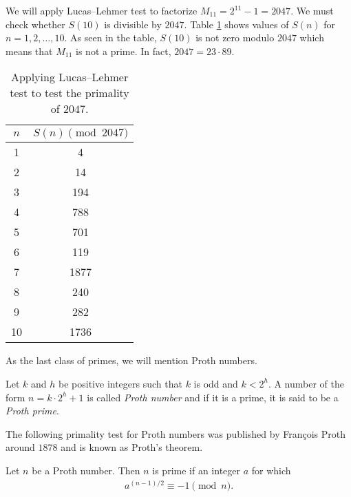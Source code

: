 \documentclass{subfiles}
\begin{document}
	\begin{example}
		We will apply Lucas--Lehmer test to factorize $M_{11}=2^{11}-1=2047$. We must check whether $S(10)$ is divisible by $2047$. Table \ref{table:lucas-lehmer} shows values of $S(n)$ for $n=1,2,\ldots,10$. As seen in the table, $S(10)$ is not zero modulo $2047$ which means that $M_{11}$ is not a prime. In fact, $2047=23 \cdot 89$.
		\begin{table}
			\centering
			\begin{tabular}{|c|c|}
				\hline 
				$n$ & $S(n) \pmod {2047}$ \\ 
				\hline 
				1 & 4 \\ 
				\hline 
				2 & 14 \\ 
				\hline 
				3 & 194 \\ 
				\hline 
				4 & 788 \\ 
				\hline 
				5 & 701 \\ 
				\hline 
				6 & 119 \\ 
				\hline 
				7 & 1877 \\ 
				\hline 
				8 & 240 \\ 
				\hline 
				9 & 282 \\ 
				\hline 
				10 & 1736 \\ 
				\hline 
			\end{tabular} 
			\caption{Applying Lucas--Lehmer test to test the primality of $2047$.}
			\label{table:lucas-lehmer}
		\end{table}
	\end{example}
	
	As the last class of primes, we will mention Proth numbers.
	
	\begin{definition}
		Let $k$ and $h$ be positive integers such that $k$ is odd and $k < 2^h$. A number of the form $n=k \cdot 2^h +1$ is called \textit{Proth number} and if it is a prime, it is said to be a \textit{Proth prime}.
	\end{definition}
	
	The following primality test for Proth numbers was published by Fran\c cois Proth around $1878$ and is known as Proth's theorem.
	
	\begin{theorem}
		Let $n$ be a Proth number. Then $n$ is prime if an integer $a$ for which
		\begin{align*}
			a^{(n-1)/2} \equiv -1 \pmod n.
		\end{align*}
	\end{theorem}
	
\end{document}
